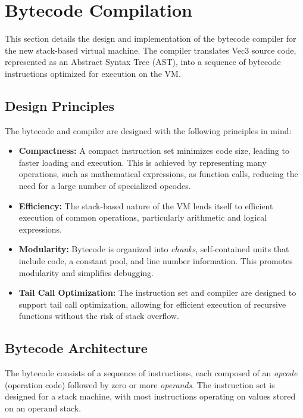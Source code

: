 \section{Bytecode Compilation}
\label{sec:bytecode-compilation}

This section details the design and implementation of the bytecode compiler for the new stack-based virtual machine. The compiler translates Vec3 source code, represented as an Abstract Syntax Tree (AST), into a sequence of bytecode instructions optimized for execution on the VM.

\subsection{Design Principles}

The bytecode and compiler are designed with the following principles in mind:

\begin{itemize}
    \item \textbf{Compactness:} A compact instruction set minimizes code size, leading to faster loading and execution. This is achieved by representing many operations, such as mathematical expressions, as function calls, reducing the need for a large number of specialized opcodes.
    \item \textbf{Efficiency:} The stack-based nature of the VM lends itself to efficient execution of common operations, particularly arithmetic and logical expressions.
    \item \textbf{Modularity:} Bytecode is organized into \textit{chunks}, self-contained units that include code, a constant pool, and line number information. This promotes modularity and simplifies debugging.
    \item \textbf{Tail Call Optimization:} The instruction set and compiler are designed to support tail call optimization, allowing for efficient execution of recursive functions without the risk of stack overflow.
\end{itemize}

\subsection{Bytecode Architecture}

The bytecode consists of a sequence of instructions, each composed of an \textit{opcode} (operation code) followed by zero or more \textit{operands}. The instruction set is designed for a stack machine, with most instructions operating on values stored on an operand stack.

